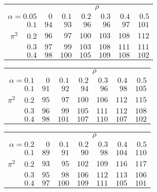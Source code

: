 \begin{tabular}{r|rrrrrr}
\hline\hline
 &\multicolumn{6}{c}{$\rho$} \\ 
 $\alpha = 0.05$ & $0$ & $0.1$ & $0.2$ & $0.3$ & $0.4$ & $0.5$ \\ 
 \hline$0.1$ & $ 94$ & $ 93$ & $ 96$ & $ 96$ & $ 97$ & $101$\\ 
$\pi^2\;\;\;$ $0.2$ & $ 96$ & $ 97$ & $100$ & $103$ & $108$ & $112$\\ 
$0.3$ & $ 97$ & $ 99$ & $103$ & $108$ & $111$ & $111$\\ 
$0.4$ & $ 98$ & $100$ & $105$ & $109$ & $108$ & $102$\\ 
 \hline 
 \end{tabular}
 
 \vspace{2em} 
 
\begin{tabular}{r|rrrrrr}
\hline\hline
 &\multicolumn{6}{c}{$\rho$} \\ 
 $\alpha = 0.1$ & $0$ & $0.1$ & $0.2$ & $0.3$ & $0.4$ & $0.5$ \\ 
 \hline$0.1$ & $ 91$ & $ 92$ & $ 94$ & $ 96$ & $ 98$ & $105$\\ 
$\pi^2\;\;\;$ $0.2$ & $ 95$ & $ 97$ & $100$ & $106$ & $112$ & $115$\\ 
$0.3$ & $ 96$ & $ 99$ & $105$ & $111$ & $112$ & $108$\\ 
$0.4$ & $ 98$ & $101$ & $107$ & $110$ & $107$ & $102$\\ 
 \hline 
 \end{tabular}
 
 \vspace{2em} 
 
\begin{tabular}{r|rrrrrr}
\hline\hline
 &\multicolumn{6}{c}{$\rho$} \\ 
 $\alpha = 0.2$ & $0$ & $0.1$ & $0.2$ & $0.3$ & $0.4$ & $0.5$ \\ 
 \hline$0.1$ & $ 89$ & $ 91$ & $ 90$ & $ 98$ & $104$ & $110$\\ 
$\pi^2\;\;\;$ $0.2$ & $ 93$ & $ 95$ & $102$ & $109$ & $116$ & $117$\\ 
$0.3$ & $ 95$ & $ 98$ & $106$ & $112$ & $113$ & $106$\\ 
$0.4$ & $ 97$ & $100$ & $109$ & $111$ & $105$ & $101$\\ 
 \hline 
 \end{tabular}